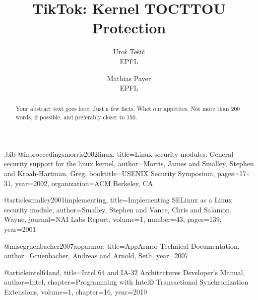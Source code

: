 \begin{filecontents}{\jobname.bib}
@inproceedings{morris2002linux,
  title={Linux security modules: General security support for the linux kernel},
  author={Morris, James and Smalley, Stephen and Kroah-Hartman, Greg},
  booktitle={USENIX Security Symposium},
  pages={17--31},
  year={2002},
  organization={ACM Berkeley, CA}
}

@article{smalley2001implementing,
  title={Implementing SELinux as a Linux security module},
  author={Smalley, Stephen and Vance, Chris and Salamon, Wayne},
  journal={NAI Labs Report},
  volume={1},
  number={43},
  pages={139},
  year={2001}
}

@misc{gruenbacher2007apparmor,
  title={AppArmor Technical Documentation},
  author={Gruenbacher, Andreas and Arnold, Seth},
  year={2007}
}

@article{intel64and,
  title={Intel 64 and IA-32 Architectures Developer's Manual},
  author={{Intel}},
  chapter={Programming with Intel® Transactional Synchronization Extensions},
  volume={1},
  chapter={16},
  year={2019}
}



\end{filecontents}



\date{}

\title{\Large \bf TikTok: Kernel TOCTTOU Protection}

\author{
{\rm Uro\v{s} Te\v{s}i\'{c}}\\
EPFL
\and
{\rm Mathias Payer}\\
EPFL
} %

\maketitle

\begin{abstract}
Your abstract text goes here. Just a few facts. Whet our appetites.
Not more than 200 words, if possible, and preferably closer to 150.
\end{abstract}


